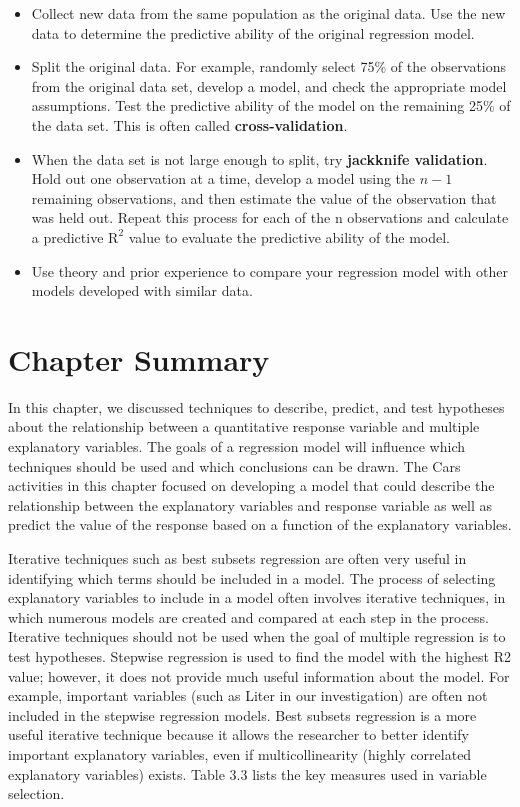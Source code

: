 \documentclass[
]{book}
\begin{document}
\begin{itemize}
\item
  Collect new data from the same population as the original data. Use the new data to determine the
  predictive ability of the original regression model.
\item
  Split the original data. For example, randomly select 75\% of the observations from the original data
  set, develop a model, and check the appropriate model assumptions. Test the predictive ability of the
  model on the remaining 25\% of the data set. This is often called \textbf{cross-validation}.
\item
  When the data set is not large enough to split, try \textbf{jackknife validation}. Hold out one observation at a time, develop a model using the \(n-1\) remaining observations, and then estimate the value of the observation that was held out. Repeat this process for each of the n observations and calculate a predictive \(\mathrm{R}^2\) value to evaluate the predictive ability of the model.
\item
  Use theory and prior experience to compare your regression model with other models developed with
  similar data.
\end{itemize}

\hypertarget{chapter-summary-2}{%
\section{Chapter Summary}\label{chapter-summary-2}}

In this chapter, we discussed techniques to describe, predict, and test hypotheses about the relationship between a quantitative response variable and multiple explanatory variables. The goals of a regression model will influence which techniques should be used and which conclusions can be drawn. The Cars activities in this chapter focused on developing a model that could describe the relationship between the explanatory variables and response variable as well as predict the value of the response based on a function of the explanatory variables.

Iterative techniques such as best subsets regression are often very useful in identifying which terms should be included in a model. The process of selecting explanatory variables to include in a model often involves iterative techniques, in which numerous models are created and compared at each step in the process. Iterative techniques should not be used when the goal of multiple regression is to test hypotheses. Stepwise regression is used to find the model with the highest R2 value; however, it does not provide much useful information about the model. For example, important variables (such as Liter in our investigation) are often not included in the stepwise regression models. Best subsets regression is a more useful iterative technique because it allows the researcher to better identify important explanatory variables, even if multicollinearity (highly correlated explanatory variables) exists. Table 3.3 lists the key measures used in variable selection.
\end{document}
